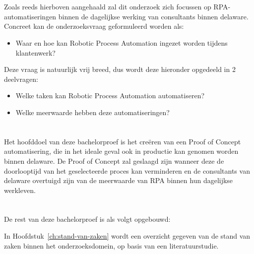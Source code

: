 \section{}%
\label{sec:onderzoeksvraag}

Zoals reeds hierboven aangehaald zal dit onderzoek zich focussen op RPA-automatiseringen binnen de dagelijkse werking van consultants binnen delaware. Concreet kan de onderzoeksvraag geformuleerd worden als:

\begin{itemize}
  \item Waar en hoe kan Robotic Process Automation ingezet worden tijdens klantenwerk?
\end{itemize}

Deze vraag is natuurlijk vrij breed, dus wordt deze hieronder opgedeeld in 2 deelvragen:

\begin{itemize}
    \item Welke taken kan Robotic Process Automation automatiseren?
    \item Welke meerwaarde hebben deze automatiseringen?
\end{itemize}

\section{}%
\label{sec:onderzoeksdoelstelling}

Het hoofddoel van deze bachelorproef is het creëren van een Proof of Concept automatisering, die in het ideale geval ook in productie kan genomen worden binnen delaware.
De Proof of Concept zal geslaagd zijn wanneer deze de doorlooptijd van het geselecteerde proces kan verminderen en de consultants van delaware overtuigd zijn van de meerwaarde van RPA binnen hun dagelijkse werkleven.

\section{}%
\label{sec:opzet-bachelorproef}

De rest van deze bachelorproef is als volgt opgebouwd:

In Hoofdstuk~\ref{ch:stand-van-zaken} wordt een overzicht gegeven van de stand van zaken binnen het onderzoeksdomein, op basis van een literatuurstudie.

